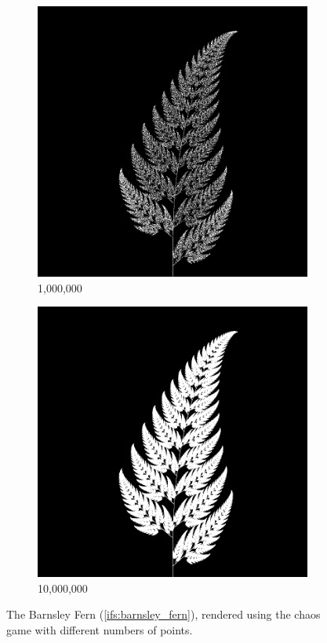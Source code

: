 \documentclass[11pt]{article}
\begin{document}
\begin{figure}
     \centering
     \begin{subfigure}[b]{0.4\textwidth}
         \centering
         \includegraphics[width=\textwidth]{figures/barnsley_1000000}
         \caption{1,000,000}
         \label{figure:barnsley_mil}
     \end{subfigure}
     \hfill
     \begin{subfigure}[b]{0.4\textwidth}
         \centering
         \includegraphics[width=\textwidth]{figures/barnsley_100000000}
         \caption{10,000,000}
         \label{figure:barnsley_ten_mil}
     \end{subfigure}
        \caption{The Barnsley Fern (\autoref{ifs:barnsley_fern}), rendered using the chaos game with different numbers of points.}
        \label{figure:barnsley_chaos_game_points}
\end{figure}
\end{document}
